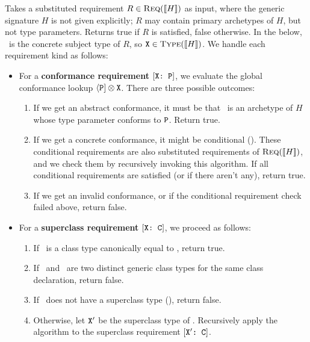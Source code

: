 \documentclass[../generics]{subfiles}
\begin{document}
\begin{algorithm}\label{reqissatisfied}
Takes a substituted requirement $R\in\textsc{Req}({[\![H]\!]})$ as input, where the generic signature $H$ is not given explicitly; $R$ may contain primary archetypes of $H$, but not type parameters. Returns true if $R$ is satisfied, false otherwise. In the below, \tX\ is the concrete subject type of $R$, so $\texttt{X}\in\textsc{Type}({[\![H]\!]})$. We handle each requirement kind as follows:
\begin{itemize}
\item For a \textbf{conformance requirement} $[\texttt{X:~P}]$, we evaluate the global conformance lookup $\langle\texttt{P}] \otimes \texttt{X}$. There are three possible outcomes:
\begin{enumerate}
\item If we get an abstract conformance, it must be that \tX\ is an archetype of $H$ whose type parameter conforms to $\texttt{P}$. Return true.
\item If we get a concrete conformance, it might be conditional (). These conditional requirements are also substituted requirements of $\textsc{Req}({[\![H]\!]})$, and we check them by recursively invoking this algorithm. If all conditional requirements are satisfied (or if there aren't any), return true.
\item If we get an invalid conformance, or if the conditional requirement check failed above, return false.
\end{enumerate}
\item For a \textbf{superclass requirement} $[\texttt{X:~C}]$, we proceed as follows:
\begin{enumerate}
\item If \tX\ is a class type canonically equal to \tC, return true.
\item If \tX\ and \tC\ are two distinct generic class types for the same class declaration, return false.
\item If \tX\ does not have a superclass type (), return false.
\item Otherwise, let $\texttt{X}'$ be the superclass type of \tX. Recursively apply the algorithm to the superclass requirement $[\texttt{$\texttt{X}'$:~C}]$.

\end{enumerate}
\end{itemize}
\end{algorithm}
\end{document}
